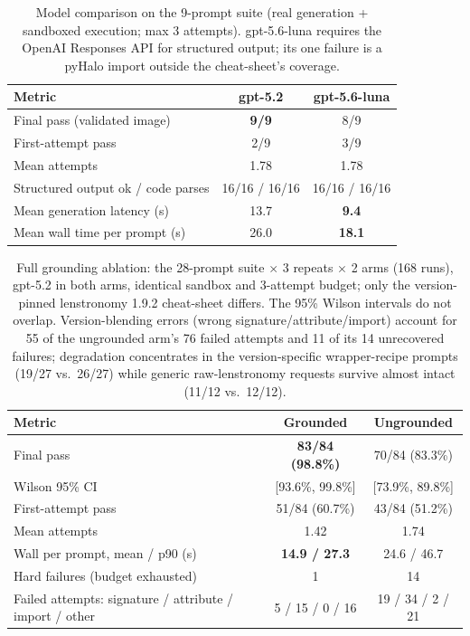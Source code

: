 \documentclass{article}
\begin{document}
\begin{table}[t]
  \caption{Model comparison on the 9-prompt suite (real generation + sandboxed
  execution; max 3 attempts). gpt-5.6-luna requires the OpenAI Responses API for
  structured output; its one failure is a pyHalo import outside the cheat-sheet's
  coverage.}
  \label{tab:models}
  \centering
  \small
  \begin{tabular}{lcc}
    \toprule
    Metric & gpt-5.2 & gpt-5.6-luna \\
    \midrule
    Final pass (validated image) & \textbf{9/9} & 8/9 \\
    First-attempt pass & 2/9 & 3/9 \\
    Mean attempts & 1.78 & 1.78 \\
    Structured output ok / code parses & 16/16 / 16/16 & 16/16 / 16/16 \\
    Mean generation latency (s) & 13.7 & \textbf{9.4} \\
    Mean wall time per prompt (s) & 26.0 & \textbf{18.1} \\
    \bottomrule
  \end{tabular}
\end{table}

\begin{table}[t]
  \caption{Full grounding ablation: the 28-prompt suite $\times$ 3 repeats
  $\times$ 2 arms (168 runs), gpt-5.2 in both arms, identical sandbox and
  3-attempt budget; only the version-pinned lenstronomy 1.9.2 cheat-sheet
  differs. The 95\% Wilson intervals do not overlap. Version-blending errors
  (wrong signature/attribute/import) account for 55 of the ungrounded arm's 76
  failed attempts and 11 of its 14 unrecovered failures; degradation concentrates
  in the version-specific wrapper-recipe prompts (19/27 vs.\ 26/27) while generic
  raw-lenstronomy requests survive almost intact (11/12 vs.\ 12/12).}
  \label{tab:ablation}
  \centering
  \small
  \begin{tabular}{lcc}
    \toprule
    Metric & Grounded & Ungrounded \\
    \midrule
    Final pass & \textbf{83/84 (98.8\%)} & 70/84 (83.3\%) \\
    \quad Wilson 95\% CI & [93.6\%, 99.8\%] & [73.9\%, 89.8\%] \\
    First-attempt pass & 51/84 (60.7\%) & 43/84 (51.2\%) \\
    Mean attempts & 1.42 & 1.74 \\
    Wall per prompt, mean / p90 (s) & \textbf{14.9 / 27.3} & 24.6 / 46.7 \\
    Hard failures (budget exhausted) & 1 & 14 \\
    Failed attempts: signature / attribute / import / other & 5 / 15 / 0 / 16 & 19 / 34 / 2 / 21 \\
    \bottomrule
  \end{tabular}
\end{table}
\end{document}
